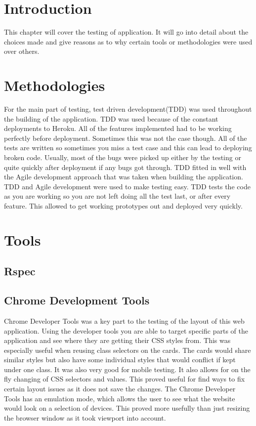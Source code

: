 \section{Introduction}
This chapter will cover the testing of application. It will go into detail about the choices made and give reasons as to why certain tools or methodologies were used over others.\\

\section{Methodologies}
For the main part of testing, test driven development(TDD) was used throughout the building of the application. TDD was used because of the constant deployments to Heroku. All of the features implemented had to be working perfectly before deployment. Sometimes this was not the case though. All of the tests are written so sometimes you miss a test case and this can lead to deploying broken code. Usually, most of the bugs were picked up either by the testing or quite quickly after deployment if any bugs got through. TDD fitted in well with the Agile development approach that was taken when building the application. TDD and Agile development were used to make testing easy. TDD tests the code as you are working so you are not left doing all the test last, or after every feature. This allowed to get working prototypes out and deployed very quickly.\\

\section{Tools}
\subsection{Rspec}
\subsection{Chrome Development Tools}
Chrome Developer Tools \citep{cdt:2014} was a key part to the testing of the layout of this web application. Using the developer tools you are able to target specific parts of the application and see where they are getting their CSS styles from. This was especially useful when reusing class selectors on the cards. The cards would share similar styles but also have some individual styles that would conflict if kept under one class. It was also very good for mobile testing. It also allows for on the fly changing of CSS selectors and values. This proved useful for find ways to fix certain layout issues as it does not save the changes. The Chrome Developer Tools has an emulation mode, which allows the user to see what the website would look on a selection of devices. This proved more usefully than just resizing the browser window as it took viewport into account. \\

